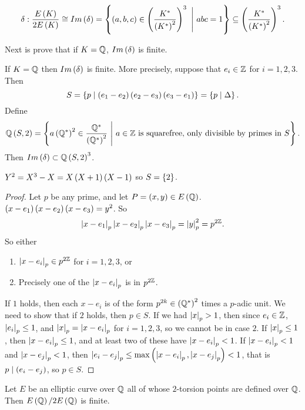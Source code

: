 \pagebreak

$$ \delta : \dfrac{E\rb{K}}{2E\rb{K}} \cong Im\rb{\delta} = \cb{\rb{a, b, c} \in \rb{\dfrac{K^*}{\rb{K^*}^2}}^3 \ \Bigg| \ abc = 1} \subseteq \rb{\dfrac{K^*}{\rb{K^*}^2}}^3. $$


Next is prove that if $ K = \mathbb{Q} $, $ Im\left( \delta \right) $ is finite.

\begin{proposition}
\label{prop:8.5}
If $ K = \mathbb{Q} $ then $ Im\left( \delta \right) $ is finite. More precisely, suppose that $ e_i \in \mathbb{Z} $ for $ i = 1, 2, 3 $. Then
$$ S = \left\{ p \mid \left( e_1 - e_2 \right)\left( e_2 - e_3 \right)\left( e_3 - e_1 \right) \right\} = \left\{ p \mid \Delta \right\}. $$
Define
$$ \mathbb{Q}\left( S, 2 \right) = \left\{ a\left( \mathbb{Q}^* \right)^2 \in \dfrac{\mathbb{Q}^*}{\left( \mathbb{Q}^* \right)^2} \ \Bigg| \ a \in \mathbb{Z} \ \text{is squarefree, only divisible by primes in} \ S \right\}. $$
Then $ Im\left( \delta \right) \subset \mathbb{Q}\left( S, 2 \right)^3 $.
\end{proposition}

\begin{example*}
$ Y^2 = X^3 - X = X\left( X + 1 \right)\left( X - 1 \right) $ so $ S = \left\{ 2 \right\} $.
\end{example*}

\begin{proof}
Let $ p $ be any prime, and let $ P = \left( x, y \right) \in E\left( \mathbb{Q} \right) $. $ \left( x - e_1 \right)\left( x - e_2 \right)\left( x - e_3 \right) = y^2 $. So
$$ \left\lvert x - e_1 \right\rvert_p\left\lvert x - e_2 \right\rvert_p\left\lvert x - e_3 \right\rvert_p = \left\lvert y \right\rvert_p^2 = p^{2\mathbb{Z}}. $$
So either
\begin{enumerate}
\item $ \left\lvert x - e_i \right\rvert_p \in p^{2\mathbb{Z}} $ for $ i = 1, 2, 3 $, or
\item Precisely one of the $ \left\lvert x - e_i \right\rvert_p $ is in $ p^{2\mathbb{Z}} $.
\end{enumerate}
If $ 1 $ holds, then each $ x - e_i $ is of the form $ p^{2k} \in \left( \mathbb{Q}^* \right)^2 $ times a $ p $-adic unit. We need to show that if $ 2 $ holds, then $ p \in S $. If we had $ \left\lvert x \right\rvert_p > 1 $, then since $ e_i \in \mathbb{Z} $, $ \left\lvert e_i \right\rvert_p \le 1 $, and $ \left\lvert x \right\rvert_p = \left\lvert x - e_i \right\rvert_p $ for $ i = 1, 2, 3 $, so we cannot be in case $ 2 $. If $ \left\lvert x \right\rvert_p \le 1 $, then $ \left\lvert x - e_i \right\rvert_p \le 1 $, and at least two of these have $ \left\lvert x - e_i \right\rvert_p < 1 $. If $ \left\lvert x - e_i \right\rvert_p < 1 $ and $ \left\lvert x - e_j \right\rvert_p < 1 $, then $ \left\lvert e_i - e_j \right\rvert_p \le \max\left( \left\lvert x - e_i \right\rvert_p, \left\lvert x - e_j \right\rvert_p \right) < 1 $, that is $ p \mid \left( e_i - e_j \right) $, so $ p \in S $.
\end{proof}

\begin{theorem}
Let $ E $ be an elliptic curve over $ \mathbb{Q} $ all of whose $ 2 $-torsion points are defined over $ \mathbb{Q} $. Then $ E\left( \mathbb{Q} \right) / 2E\left( \mathbb{Q} \right) $ is finite.
\end{theorem}

